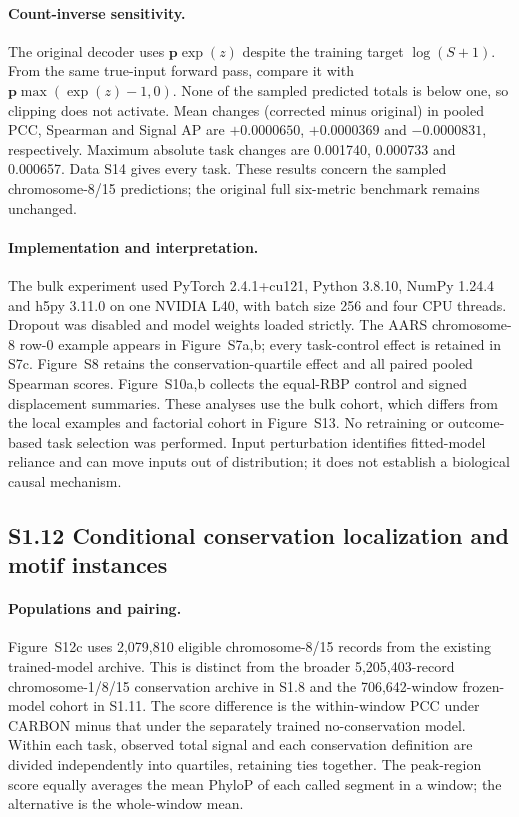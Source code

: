 \documentclass[11pt]{article}
\begin{document}
\paragraph{Count-inverse sensitivity.} The original decoder uses $\mathbf p\exp(z)$ despite the training target $\log(S+1)$. From the same true-input forward pass, compare it with $\mathbf p\max(\exp(z)-1,0)$. None of the sampled predicted totals is below one, so clipping does not activate. Mean changes (corrected minus original) in pooled PCC, Spearman and Signal AP are $+0.0000650$, $+0.0000369$ and $-0.0000831$, respectively. Maximum absolute task changes are 0.001740, 0.000733 and 0.000657. Data S14 gives every task. These results concern the sampled chromosome-8/15 predictions; the original full six-metric benchmark remains unchanged.

\paragraph{Implementation and interpretation.} The bulk experiment used PyTorch 2.4.1+cu121, Python 3.8.10, NumPy 1.24.4 and h5py 3.11.0 on one NVIDIA L40, with batch size 256 and four CPU threads. Dropout was disabled and model weights loaded strictly. The AARS chromosome-8 row-0 example appears in Figure~S7a,b; every task-control effect is retained in S7c. Figure~S8 retains the conservation-quartile effect and all paired pooled Spearman scores. Figure~S10a,b collects the equal-RBP control and signed displacement summaries. These analyses use the bulk cohort, which differs from the local examples and factorial cohort in Figure~S13. No retraining or outcome-based task selection was performed. Input perturbation identifies fitted-model reliance and can move inputs out of distribution; it does not establish a biological causal mechanism.

\subsection*{S1.12 Conditional conservation localization and motif instances}

\paragraph{Populations and pairing.} Figure~S12c uses 2,079,810 eligible chromosome-8/15 records from the existing trained-model archive. This is distinct from the broader 5,205,403-record chromosome-1/8/15 conservation archive in S1.8 and the 706,642-window frozen-model cohort in S1.11. The score difference is the within-window PCC under CARBON minus that under the separately trained no-conservation model. Within each task, observed total signal and each conservation definition are divided independently into quartiles, retaining ties together. The peak-region score equally averages the mean PhyloP of each called segment in a window; the alternative is the whole-window mean.
\end{document}
